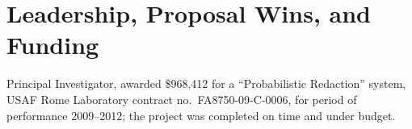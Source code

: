 \section*{Leadership, Proposal Wins, and Funding}

\vspace{-2mm}
Principal Investigator, awarded \$968,412 for a ``Probabilistic Redaction''
system, USAF Rome Laboratory contract no.\ FA8750-09-C-0006, for period of
performance 2009--2012; the project was completed on time and under budget.

